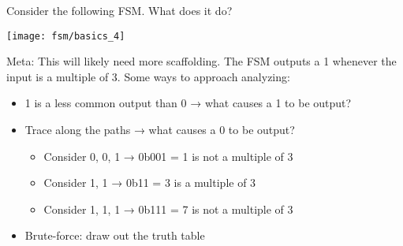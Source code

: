 \begin{blocksection}
\question
Consider the following FSM. What does it do?

\texttt{[image: fsm/basics\_4]}

\begin{solution}
Meta: This will likely need more scaffolding.
The FSM outputs a 1 whenever the input is a multiple of 3. Some ways to approach analyzing:
\begin{itemize}
\item 1 is a less common output than 0 → what causes a 1 to be output?
\item Trace along the paths → what causes a 0 to be output?
\begin{itemize}
	\item Consider 0,  0,  1 → 0b001 = 1 is not  a multiple of 3
	\item Consider 1, 1 → 0b11 = 3 is a multiple of 3
	\item Consider 1, 1, 1 → 0b111 = 7 is not a multiple of 3
\end{itemize}
\item Brute-force: draw out the truth table
\end{itemize}
\end{solution}

\end{blocksection}